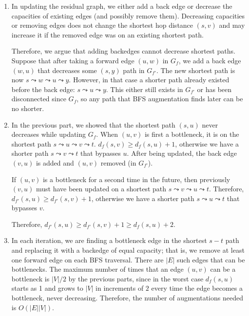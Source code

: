 \documentclass[12pt]{article}
\begin{document}
\begin{enumerate}
\item %
In updating the residual graph, we either add a back edge or decrease the
capacities of existing edges (and possibly remove them).
Decreasing capacities or removing edges
does not change the shortest hop distance $(s,v)$ and may increase it if
the removed edge was on an existing shortest path.

Therefore, we argue that adding backedges cannot decrease shortest paths.
Suppose that after taking a forward edge $(u,w)$ in
$G_f$, we add a back edge $(w,u)$ that
decreases some $(s,y)$ path in $G_{f'}$. The new
shortest path is now
$s \leadsto w \leadsto u \leadsto y$. However, in that case
a shorter path already existed before the back edge:
$s \leadsto u \leadsto y$. This either still exists in $G_{f'}$ or has been
disconnected since $G_f$, so any path that BFS augmentation finds later
can be no shorter.
\item %
In the previous part, we showed that the shortest path $(s,u)$ never
decreases while updating $G_f$. When $(u,v)$ is first a bottleneck, it
is on the shortest path $s \leadsto u \leadsto v \leadsto t$.
$d_f(s,v) \ge d_f(s,u) + 1$, otherwise we have a shorter path
$s \leadsto v \leadsto t$ that bypasses $u$. After being updated, the back edge
$(v,u)$ is added and $(u,v)$ removed (in $G_{f'}$).

If $(u,v)$ is a bottleneck for a second time in the future,
then previously $(v,u)$
must have been updated on a shortest path $s \leadsto v \leadsto u \leadsto t$.
Therefore,
$d_{f'}(s,u) \ge d_{f'}(s,v) + 1$, otherwise we have a shorter path
$s \leadsto u \leadsto t$ that bypasses $v$.

Therefore, $d_{f'}(s,u) \ge d_{f'}(s,v) + 1 \ge d_f(s,u) + 2$.

\item %
In each iteration, we are finding a bottleneck edge in the shortest $s-t$ path
and replacing it with a backedge of equal capacity; that is,
we remove at least one forward edge on each BFS traversal.
There are $|E|$ such edges that can be bottlenecks.
The maximum number of times that an edge $(u,v)$
can be a bottleneck is $|V|/2$ by the previous parts, since in the worst case
$d_f(s,u)$ starts as 1 and grows to $|V|$ in increments of $2$ every time
the edge becomes a bottleneck, never decreasing.
Therefore, the number of augmentations needed
is $O(|E||V|)$.

\end{enumerate}
\end{document}
